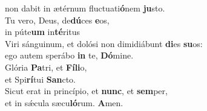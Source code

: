 \oddverse non dabit in ætérnum fluctuati\textbf{ó}nem \textbf{ju}sto.\\
\evenverse Tu vero, Deus, de\textbf{dú}ces \textbf{e}os,~\*\\
\evenverse in púte\textbf{um} in\textbf{té}ritus\\
\oddverse Viri sánguinum, et dolósi non dimidiábunt \textbf{di}es \textbf{su}os:~\*\\
\oddverse ego autem sperábo \textbf{in} te, \textbf{Dó}mine.\\
\evenverse Glória \textbf{Pa}tri, et \textbf{Fí}\textbf{li}o,~\*\\
\evenverse et Spi\textbf{rí}tui \textbf{San}cto.\\
\oddverse Sicut erat in princípio, et \textbf{nunc}, et \textbf{sem}per,~\*\\
\oddverse et in sǽcula sæcu\textbf{ló}rum. \textbf{A}men.\\
